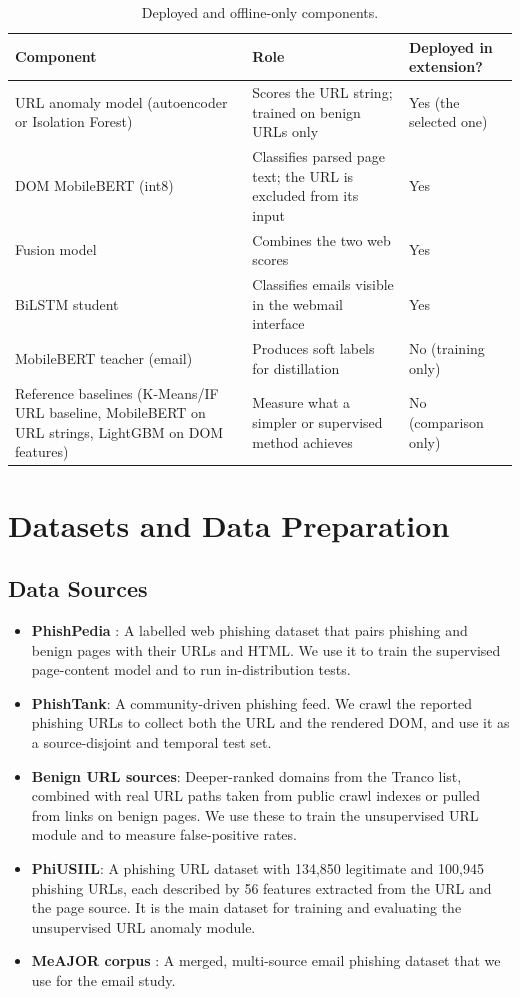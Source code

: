 \documentclass{FastFyp}
\begin{document}
\begin{table}[!ht]
\centering
\caption{Deployed and offline-only components.}
\label{tab:components}
\begin{tabularx}{\textwidth}{|>{\raggedright\arraybackslash}X|>{\raggedright\arraybackslash}X|>{\raggedright\arraybackslash}X|}
\hline
\textbf{Component} & \textbf{Role} & \textbf{Deployed in extension?} \\
\hline
URL anomaly model (autoencoder or Isolation Forest) & Scores the URL string; trained on benign URLs only & Yes (the selected one) \\
\hline
DOM MobileBERT (int8) & Classifies parsed page text; the URL is excluded from its input & Yes \\
\hline
Fusion model & Combines the two web scores & Yes \\
\hline
BiLSTM student & Classifies emails visible in the webmail interface & Yes \\
\hline
MobileBERT teacher (email) & Produces soft labels for distillation & No (training only) \\
\hline
Reference baselines (K-Means/IF URL baseline, MobileBERT on URL strings, LightGBM on DOM features) & Measure what a simpler or supervised method achieves & No (comparison only) \\
\hline
\end{tabularx}
\end{table}

\section{Datasets and Data Preparation}
\label{sec:data}

\subsection{Data Sources}
\begin{itemize}
    \item \textbf{PhishPedia} \cite{phishpedia2021}: A labelled web phishing dataset that pairs phishing and benign pages with their URLs and HTML. We use it to train the supervised page-content model and to run in-distribution tests.
    \item \textbf{PhishTank}: A community-driven phishing feed. We crawl the reported phishing URLs to collect both the URL and the rendered DOM, and use it as a source-disjoint and temporal test set.
    \item \textbf{Benign URL sources}: Deeper-ranked domains from the Tranco list, combined with real URL paths taken from public crawl indexes or pulled from links on benign pages. We use these to train the unsupervised URL module and to measure false-positive rates.
    \item \textbf{PhiUSIIL}: A phishing URL dataset with 134,850 legitimate and 100,945 phishing URLs, each described by 56 features extracted from the URL and the page source. It is the main dataset for training and evaluating the unsupervised URL anomaly module.
    \item \textbf{MeAJOR corpus} \cite{meajor2025}: A merged, multi-source email phishing dataset that we use for the email study.
\end{itemize}
\end{document}
